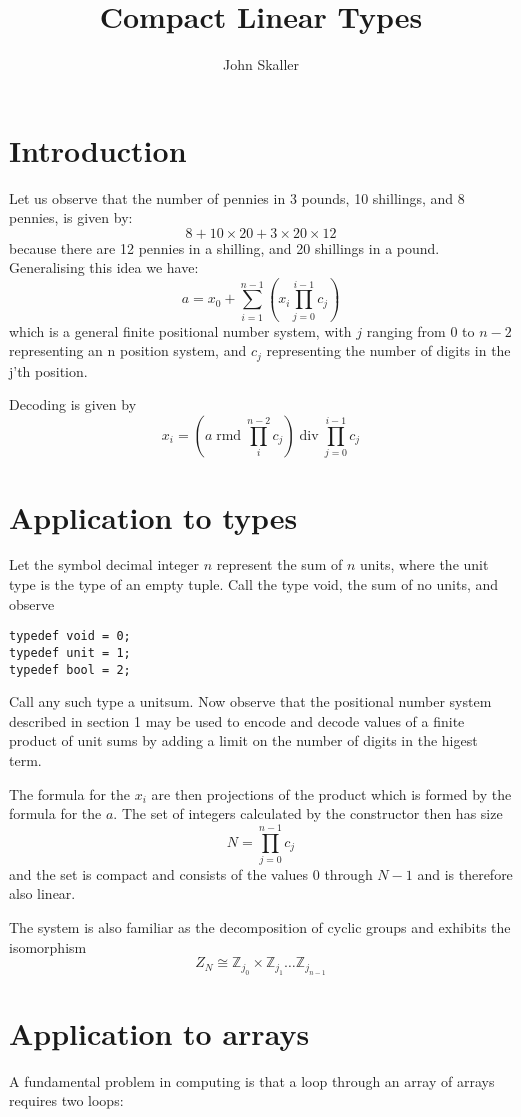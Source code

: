 \documentclass{article}
\title{Compact Linear Types}
\author{John Skaller}
\DeclareMathOperator{\quot}{div}
\DeclareMathOperator{\rmd}{rmd}
\begin{document}
\maketitle
\section{Introduction}
Let us observe that the number of pennies in 3 pounds, 10 shillings, and 8 
pennies, is given by:
$$8 + 10 \times 20 + 3 \times 20 \times 12$$
because there are 12 pennies in a shilling, and 20 shillings in a pound.
Generalising this idea we have:
$$a=x_0+\sum_{i=1}^{n-1} (x_i \prod^{i-1}_{j=0} c_j)$$
which is a general finite positional number system, with $j$ ranging from 0 to $n-2$ 
representing an n position system, and $c_j$ representing the number of digits
in the j'th position.

Decoding is given by 
$$x_i = (a \rmd \prod^{n-2}_i c_j) \quot \prod^{i-1}_{j=0} c_j$$

\section{Application to types}
Let the symbol decimal integer $n$ represent the sum of $n$ units,
where the unit type is the type of an empty tuple. Call the
type void, the sum of no units, and observe

\begin{verbatim}
typedef void = 0;
typedef unit = 1;
typedef bool = 2;
\end{verbatim}

Call any such type a unitsum. Now observe that the positional number
system described in section 1 may be used to encode and decode 
values of a finite product of unit sums by adding a limit on the
number of digits in the higest term.

The formula for the $x_i$ are then projections of the product
which is formed by the formula for the $a$. The set of integers
calculated by the constructor then has size
$$N=\prod_{j=0}^{n-1}c_j$$
and the set is compact and consists of the values 0 through $N-1$
and is therefore also linear.

The system is also familiar as the decomposition of cyclic groups
and exhibits the isomorphism
$$Z_N \cong {\mathbb Z}_{j_0} \times {\mathbb Z}_{j_1} \ldots {\mathbb Z}_{j_{n-1}}$$

\section{Application to arrays}
A fundamental problem in computing is that a loop
through an array of arrays requires two loops:
\end{document}
